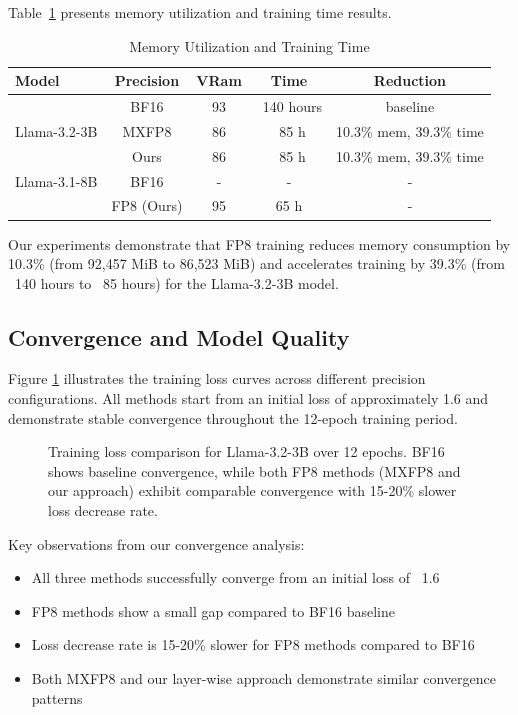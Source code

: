 \documentclass[conference]{IEEEtran}
\begin{document}
Table~\ref{tab:memory_scaling} presents memory utilization and training time results.

\begin{table}[htbp]
\centering
\caption{Memory Utilization and Training Time}
\begin{tabular}{@{}lcccc@{}}
\toprule
\textbf{Model} & \textbf{Precision} & \textbf{VRam} & \textbf{Time} & \textbf{Reduction} \\
\midrule
\multirow{3}{*}{Llama-3.2-3B} & BF16 & 93 & ~140 hours & baseline \\
 & MXFP8 & 86 & ~85 h & 10.3\% mem, 39.3\% time \\
 & Ours & 86 & ~85 h & 10.3\% mem, 39.3\% time \\
\midrule
Llama-3.1-8B & BF16 & - & - & - \\
 & FP8 (Ours) & 95 & 65 h & - \\
\bottomrule
\end{tabular}
\label{tab:memory_scaling}
\end{table}

Our experiments demonstrate that FP8 training reduces memory consumption by 10.3\% (from 92,457 MiB to 86,523 MiB) and accelerates training by 39.3\% (from ~140 hours to ~85 hours) for the Llama-3.2-3B model.

\subsection{Convergence and Model Quality}

Figure \ref{fig:convergence_analysis} illustrates the training loss curves across different precision configurations. All methods start from an initial loss of approximately 1.6 and demonstrate stable convergence throughout the 12-epoch training period.

\begin{figure}[htbp]
    \centering
    \caption{Training loss comparison for Llama-3.2-3B over 12 epochs. BF16 shows baseline convergence, while both FP8 methods (MXFP8 and our approach) exhibit comparable convergence with 15-20\% slower loss decrease rate.}
    \label{fig:convergence_analysis}
\end{figure}

Key observations from our convergence analysis:
\begin{itemize}
\item All three methods successfully converge from an initial loss of ~1.6
\item FP8 methods show a small gap compared to BF16 baseline
\item Loss decrease rate is 15-20\% slower for FP8 methods compared to BF16
\item Both MXFP8 and our layer-wise approach demonstrate similar convergence patterns
\end{itemize}
\end{document}

